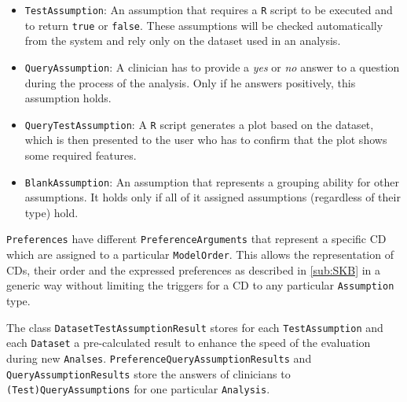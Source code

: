\bigskip

\begin{itemize}

	\item \texttt{TestAssumption}: An assumption that requires a \texttt{R} script to be executed and to return \texttt{true} or \texttt{false}. These assumptions will be checked automatically from the system and rely only on the dataset used in an analysis.
	\item \texttt{QueryAssumption}: A clinician has to provide a \textit{yes} or \textit{no} answer to a question during the process of the analysis. Only if he answers positively, this assumption holds.
	\item \texttt{QueryTestAssumption}: A \texttt{R} script generates a plot based on the dataset, which is then presented to the user who has to confirm that the plot shows some required features.
	\item \texttt{BlankAssumption}: An assumption that represents a grouping ability for other assumptions. It holds only if all of it assigned assumptions (regardless of their type) hold. 
\end{itemize}
\bigskip


\texttt{Preferences} have different \texttt{PreferenceArguments} that represent a specific \gls{CD} which are assigned to a particular \texttt{ModelOrder}. This allows the representation of \glspl{CD}, their order and the expressed preferences as described in \autoref{sub:SKB} in a generic way without limiting the triggers for a \gls{CD} to any particular \texttt{Assumption} type. 

The class \texttt{DatasetTestAssumptionResult} stores for each \texttt{TestAssumption} and each \texttt{Dataset} a pre-calculated result to enhance the speed of the evaluation during new \texttt{Analses}. \texttt{PreferenceQueryAssumptionResults} and \texttt{QueryAssumptionResults} store the answers of clinicians to \texttt{(Test)QueryAssumptions} for one particular \texttt{Analysis}.
